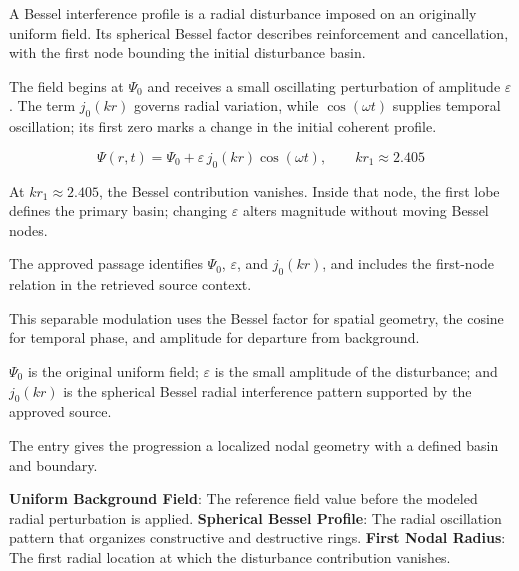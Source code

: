 
A Bessel interference profile is a radial disturbance imposed on an originally uniform field. Its spherical Bessel factor describes reinforcement and cancellation, with the first node bounding the initial disturbance basin.


The field begins at \(\Psi_0\) and receives a small oscillating perturbation of amplitude \(\varepsilon\). The term \(j_0(k r)\) governs radial variation, while \(\cos(\omega t)\) supplies temporal oscillation; its first zero marks a change in the initial coherent profile.


\[
\Psi(r,t)=\Psi_0+\varepsilon\,j_0(k r)\cos(\omega t), \qquad k r_1\approx2.405
\]


At \(k r_1\approx2.405\), the Bessel contribution vanishes. Inside that node, the first lobe defines the primary basin; changing \(\varepsilon\) alters magnitude without moving Bessel nodes.


The approved passage identifies \(\Psi_0\), \(\varepsilon\), and \(j_0(k r)\), and includes the first-node relation in the retrieved source context.


This separable modulation uses the Bessel factor for spatial geometry, the cosine for temporal phase, and amplitude for departure from background.


\(\Psi_0\) is the original uniform field; \(\varepsilon\) is the small amplitude of the disturbance; and \(j_0(k r)\) is the spherical Bessel radial interference pattern supported by the approved source.


The entry gives the progression a localized nodal geometry with a defined basin and boundary.


\noindent \textbf{Uniform Background Field}: The reference field value before the modeled radial perturbation is applied. \enspace\textbullet\enspace \textbf{Spherical Bessel Profile}: The radial oscillation pattern that organizes constructive and destructive rings. \enspace\textbullet\enspace \textbf{First Nodal Radius}: The first radial location at which the disturbance contribution vanishes.\par

